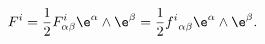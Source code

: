 \begin{equation}
F^i={1\over 2}F^i_{\alpha\beta}\e^\alpha\wedge\e^\beta=
{1\over 2}{f^i}_{\alpha\beta}\e^\alpha\wedge\e^\beta.
\end{equation}

